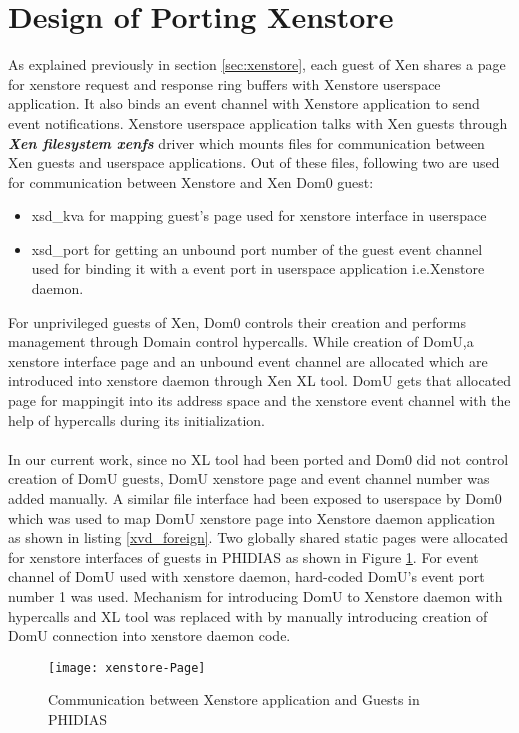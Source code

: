 \section{Design of Porting Xenstore\label{sec:xenstorestatic}}
As explained previously in section \ref{sec:xenstore}, each guest of Xen shares a page for xenstore request and response ring buffers with Xenstore userspace application. It also binds an event channel with Xenstore application to send event notifications. Xenstore userspace application talks with Xen guests through \textbf{\textit{Xen filesystem xenfs}} driver which mounts files for communication between Xen guests and userspace applications. Out of these files, following two are used for communication between Xenstore and Xen Dom0 guest:
\begin{itemize}
	\item xsd\_kva for mapping guest's page used for xenstore interface in userspace
	\item xsd\_port for getting an unbound port number of the guest event channel used for binding it with a event port in userspace application i.e.Xenstore daemon. 
\end{itemize}
For unprivileged guests of Xen, Dom0 controls their creation and performs management through Domain control hypercalls. While creation of DomU,a xenstore interface page and an unbound event channel are allocated which are introduced into xenstore daemon through Xen XL tool. DomU gets that allocated page for mappingit into its address space and the xenstore event channel with the help of hypercalls during its initialization.
\\
\\
In our current work, since no XL tool had been ported and Dom0 did not control creation of DomU guests, DomU xenstore page and event channel number was added manually. A similar file interface had been exposed to userspace by Dom0 which was used to map DomU xenstore page into Xenstore daemon application as shown in listing \ref{xvd_foreign}. Two globally shared static pages were allocated for xenstore interfaces of guests in PHIDIAS  as shown in Figure \ref{xenstore-Page}. For event channel of DomU used with xenstore daemon, hard-coded DomU's event port number 1 was used. Mechanism for introducing DomU to Xenstore daemon with hypercalls and XL tool was replaced with by manually introducing creation of DomU connection into xenstore daemon code.

\begin{figure}[!htbp]
	\centering
	\texttt{[image: xenstore-Page]}
	\caption{Communication between Xenstore application and Guests in PHIDIAS}
	\label{xenstore-Page}
\end{figure}


